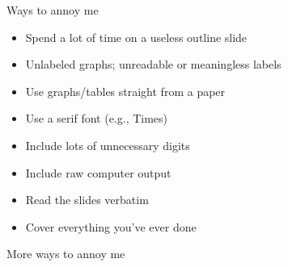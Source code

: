 \documentclass[12pt]{article}
\newcommand{\headsize}{\fontsize{35}{35} \selectfont}
\newcommand{\smallsize}{\fontsize{25}{30} \selectfont}
\begin{document}
\newpage

\headsize \color{myyellow}
\hfill \begin{minipage}{5.75in}
\centering
Ways to annoy me
\end{minipage}

\vspace{30mm} \color{mywhite} \smallsize

\hfill \begin{minipage}{9.5in}

\begin{itemize}
\itemsep18pt
\color{myblue}
\item Spend a lot of time on a useless outline slide

\item Unlabeled graphs; unreadable or meaningless labels

\item Use graphs/tables straight from a paper

\item Use a serif font (e.g., Times)

\item Include lots of unnecessary digits

\item Include raw computer output
\color{mywhite}

\item Read the slides verbatim

\item Cover everything you've ever done

\end{itemize}

\end{minipage}


\newpage

\headsize \color{myyellow}
\hfill \begin{minipage}{5.75in}
\centering
More ways to annoy me
\end{minipage}

\vspace{30mm} \color{mywhite} \smallsize
\end{document}

